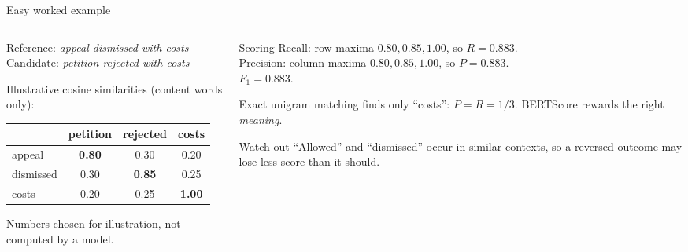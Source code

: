 \documentclass[aspectratio=169,11pt]{beamer}
\begin{document}
\begin{frame}{Easy worked example}
  \begin{columns}[T]
    \begin{column}{0.5\textwidth}
      \small
      Reference: \emph{appeal dismissed with costs}\\
      Candidate: \emph{petition rejected with costs}
      \vspace{1mm}

      Illustrative cosine similarities (content words only):
      \vspace{1mm}

      \begin{tabular}{@{}lccc@{}}
        \toprule
        & petition & rejected & costs\\
        \midrule
        appeal & \textbf{0.80} & 0.30 & 0.20\\
        dismissed & 0.30 & \textbf{0.85} & 0.25\\
        costs & 0.20 & 0.25 & \textbf{1.00}\\
        \bottomrule
      \end{tabular}
      \vspace{1mm}

      {\scriptsize Numbers chosen for illustration, not computed by a model.}
    \end{column}
    \begin{column}{0.46\textwidth}
      \begin{exampleblock}{Scoring}
        \small
        Recall: row maxima $0.80,0.85,1.00$, so $R=0.883$.\\
        Precision: column maxima $0.80,0.85,1.00$, so $P=0.883$.\\
        $F_1=0.883$.
        \vspace{1mm}

        Exact unigram matching finds only ``costs'': $P=R=1/3$. BERTScore rewards the right \emph{meaning}.
      \end{exampleblock}
      \begin{alertblock}{Watch out}
        \small
        ``Allowed'' and ``dismissed'' occur in similar contexts, so a reversed outcome may lose less score than it should.
      \end{alertblock}
    \end{column}
  \end{columns}
\end{frame}
\end{document}
